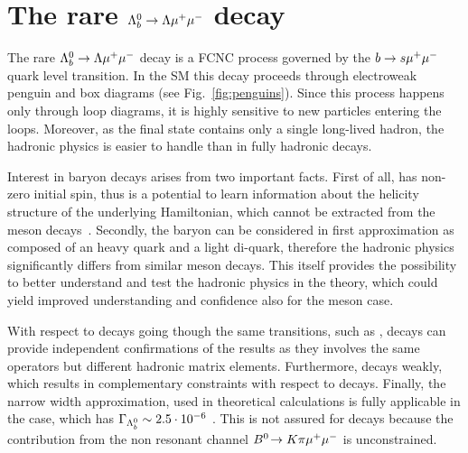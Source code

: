 \chapter{The rare ${{\Lambda}^0_{b}}\rightarrow{\ensuremath{\Lambda}}{\ensuremath{\mu^+\mu^-}}$ decay}
\label{sec:Lmumu_intro}

The rare ${{\Lambda}^0_{b}}\rightarrow{\ensuremath{\Lambda}}{\ensuremath{\mu^+\mu^-}}$ decay is a FCNC process governed by the ${b} \rightarrow {\ensuremath{s}}{\ensuremath{\mu^+\mu^-}}$ quark
level transition. In the SM this decay proceeds through electroweak penguin and \W box diagrams
(see Fig.~\ref{fig:penguins}). Since this process happens only through loop diagrams, it is highly sensitive
to new particles entering the loops. Moreover, as the final state contains only a single long-lived hadron,
the hadronic physics is easier to handle than in fully hadronic decays.

Interest in \Lb baryon decays arises from two important facts.
First of all, \Lb has non-zero initial spin, thus is a potential to learn information about the helicity structure
of the underlying Hamiltonian, which cannot be extracted from the meson decays~\cite{Hiller:2007ur,Mannel:1997xy}.
Secondly, the \Lb baryon can be considered in first approximation as composed of an heavy 
quark and a light di-quark, therefore the hadronic physics significantly differs from similar meson decays.
This itself provides the possibility to better understand and test the hadronic physics in the theory,
which could yield improved understanding and confidence also for the meson case.

With respect to \Bz decays going though the same transitions, such as \BdToKstmm, \Lb decays can provide independent
confirmations of the results as they involves the same operators but different hadronic matrix elements.
Furthermore, \Lz decays weakly, which results in complementary constraints with respect to \Bz decays.
Finally, the narrow width approximation, used in theoretical calculations is fully applicable in the \Lb case,
which has $\Gamma_{{{\Lambda}^0_{b}}} \sim 2.5 \cdot 10^{-6}$ \ev. This is not assured for \BdToKstmm decays because
the contribution from the non resonant channel $\decay{\Bz}{K\pi\mumu}$ is unconstrained.

